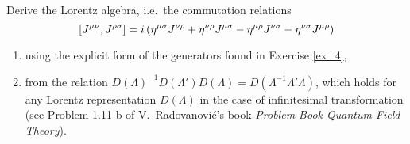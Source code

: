 \begin{ex} \label{Ex_5} 
    Derive the Lorentz algebra, i.e.\ the commutation relations
    \begin{equation}
    \label{lorentz_algebra}
        \left[ J^{\mu \nu}, J^{\rho \sigma}\right] = i\left( \eta^{\mu \sigma}J^{\nu \rho} + \eta^{\nu \rho} J^{\mu \sigma} - \eta^{\mu \rho} J^{\nu \sigma} - \eta^{\nu \sigma}J^{\mu \rho} \right)
    \end{equation}
    \begin{enumerate}[label=\alph*)]
        \item using the explicit form of the generators found in Exercise \ref{ex_4}, 
        \item from the relation $D(\Lambda)^{-1} D(\Lambda') D(\Lambda) = D(\Lambda^{-1} \Lambda' \Lambda)$, which holds for any Lorentz representation $D(\Lambda)$ in the case of infinitesimal transformation (see Problem 1.11-b of V.~Radovanovi\'c's book \emph{Problem Book Quantum Field Theory}).
    \end{enumerate}
\end{ex}


